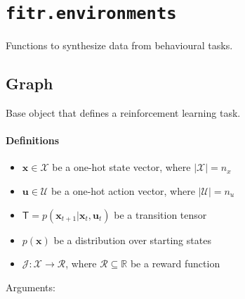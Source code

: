 \section{\texorpdfstring{\texttt{fitr.environments}}{fitr.environments}}\label{fitr.environments}

Functions to synthesize data from behavioural tasks.

\subsection{Graph}\label{graph}

\begin{Shaded}
\begin{Highlighting}[]
\end{Highlighting}
\end{Shaded}

Base object that defines a reinforcement learning task.

\paragraph{Definitions}\label{definitions}

\begin{itemize}
\tightlist
\item
  \(\mathbf x \in \mathcal X\) be a one-hot state vector, where
  \(|\mathcal X|=n_x\)
\item
  \(\mathbf u \in \mathcal U\) be a one-hot action vector, where
  \(|\mathcal U|=n_u\)
\item
  \(\mathsf T = p(\mathbf x_{t+1}|\mathbf x_t, \mathbf u_t)\) be a
  transition tensor
\item
  \(p(\mathbf x)\) be a distribution over starting states
\item
  \(\mathcal J: \mathcal X \to \mathcal R\), where
  \(\mathcal R \subseteq \mathbb R\) be a reward function
\end{itemize}

Arguments:

